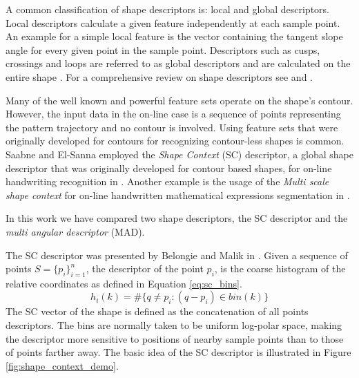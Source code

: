 \iftoggle{edit-mode}{\hspace{0pt}\marginpar{Shape descriptors types}}{}
A common classification of shape descriptors is: local and global descriptors. 
Local descriptors calculate a given feature independently at each sample point. 
An example for a simple local feature is the vector containing the tangent slope angle for every given point in the sample point. 
Descriptors such as cusps, crossings and loops are referred to as global descriptors and are calculated on the entire shape \cite{hu1997combining}. 
For a comprehensive review on shape descriptors see \cite{zhang2004review} and \cite{yang2008survey}.


\iftoggle{edit-mode}{\hspace{0pt}\marginpar{Using off-line shape descriptors for on-line HWR}}{}
Many of the well known and powerful feature sets operate on the shape's contour.  
However, the input data in the on-line case is a sequence of points representing the pattern trajectory and no contour is involved. 
Using feature sets that were originally developed for contours for recognizing contour-less shapes is common. 
Saabne and El-Sanna employed the \emph{Shape Context} (SC) descriptor, a global shape descriptor that was originally developed for contour based shapes, for on-line handwriting recognition in \cite{saabni2009hierarchical}. 
Another example is the usage of the \emph{Multi scale shape context} for on-line handwritten mathematical expressions segmentation in \cite{husegmenting}. 

\iftoggle{edit-mode}{\hspace{0pt}\marginpar{Selected Descriptors}}{}
In this work we have compared two shape descriptors, the SC descriptor and the \emph{multi angular descriptor} (MAD). 

\iftoggle{edit-mode}{\hspace{0pt}\marginpar{Shape Context}}{}
The SC descriptor was presented by Belongie and Malik in \cite{belongie2002shape}.
Given a sequence of points $S=\{p_i\}_{i=1}^n$, the descriptor of the point ${p_i}$, is the coarse histogram of the relative coordinates as defined in Equation \ref{eq:sc_bins}.
\begin{equation}
{h_i}(k) = \# \{q \ne p_i:(q - p_i) \in bin(k) \}
\label{eq:sc_bins}
\end{equation}
The SC vector of the shape is defined as the concatenation of all points descriptors.
The bins are normally taken to be uniform log-polar space, making the descriptor more sensitive to positions of nearby sample points than to those of points farther away. 
The basic idea of the SC descriptor is illustrated in Figure \ref{fig:shape_context_demo}. 


